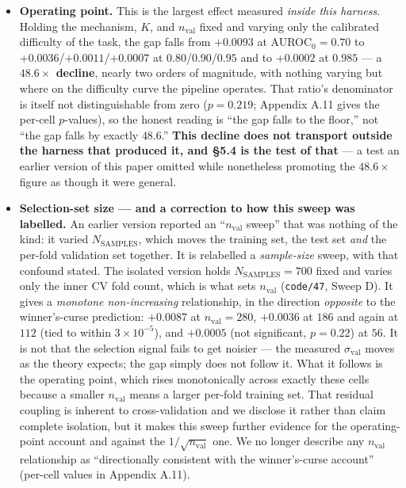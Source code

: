 \documentclass[10pt]{article} %
\begin{document}
\begin{itemize}
  Note this restriction and the degeneracy restriction above are separate and
  nearly coincident: $K\geq10$ was chosen to flatten the operating-point drift,
  $K\geq15$ falls out of the bitwise-identity gate, and the two agree on
  everything except $K=10$ --- which the degeneracy gate excludes at $65\%$
  identical folds and which the reported $R^2=0.939$ fit therefore drops.
\item \textbf{Operating point.} This is the largest effect measured
  \emph{inside this harness}. Holding the mechanism, $K$, and $n_{\text{val}}$
  fixed and varying only the calibrated difficulty of the task, the gap falls
  from $+0.0093$ at AUROC$_0=0.70$ to $+0.0036$/$+0.0011$/$+0.0007$ at
  $0.80$/$0.90$/$0.95$ and to $+0.0002$ at $0.985$ --- a
  \textbf{$48.6\times$ decline}, nearly two orders of magnitude, with
  nothing varying but where on the difficulty curve the pipeline
  operates. That ratio's denominator is itself not distinguishable from zero
  ($p=0.219$; Appendix A.11 gives the per-cell $p$-values), so the honest
  reading is ``the gap falls to the floor,'' not ``the gap falls by exactly
  $48.6$.'' \textbf{This decline does not transport outside the harness that
  produced it, and §5.4 is the test of that} --- a test an earlier version of
  this paper omitted while nonetheless promoting the $48.6\times$ figure as
  though it were general.
\item \textbf{Selection-set size --- and a correction to how this sweep was
    labelled.} An earlier version reported an ``$n_{\text{val}}$ sweep'' that was
  nothing of the kind: it varied $N_{\text{SAMPLES}}$, which moves the training
  set, the test set \emph{and} the per-fold validation set together. It is
  relabelled a \emph{sample-size} sweep, with that confound stated. The isolated
  version holds $N_{\text{SAMPLES}}=700$ fixed and varies only the inner CV fold
  count, which is what sets $n_{\text{val}}$ (\texttt{code/47}, Sweep D). It
  gives a \emph{monotone non-increasing} relationship, in the direction
  \emph{opposite} to the winner's-curse prediction: $+0.0087$ at
  $n_{\text{val}}=280$, $+0.0036$ at $186$ and again at $112$ (tied to within
  $3\times10^{-5}$), and $+0.0005$ (not significant, $p=0.22$) at $56$. It is
  not that the selection signal fails to get noisier --- the measured
  $\sigma_{\text{val}}$ moves as the theory expects; the gap simply does not
  follow it. What it follows is the operating point, which rises monotonically
  across exactly these cells because a smaller $n_{\text{val}}$ means a larger
  per-fold training set. That residual coupling is inherent to cross-validation
  and we disclose it rather than claim complete isolation, but it makes this
  sweep further evidence for the operating-point account and against the
  $1/\sqrt{n_{\text{val}}}$ one. We no longer describe any $n_{\text{val}}$
  relationship as ``directionally consistent with the winner's-curse account''
  (per-cell values in Appendix A.11).
\end{itemize}
\end{document}
